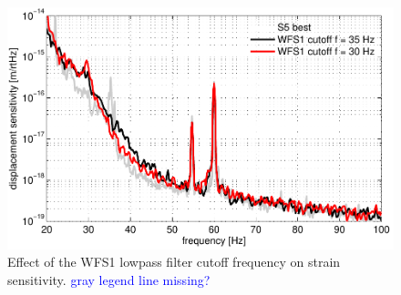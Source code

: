 \begin{figure}
\begin{centering}
\includegraphics[width=1.0\textwidth]{figures/cutoffWFS1_DARMcompare.pdf}
\caption[Effect of the WFS1 lowpass filter cutoff frequency on strain
sensitivity.]{Effect of the WFS1 lowpass filter cutoff frequency on
  strain sensitivity. \textcolor{blue}{gray legend line missing?}}
\label{fig:WFS1cutoff}
\end{centering}
\end{figure}







